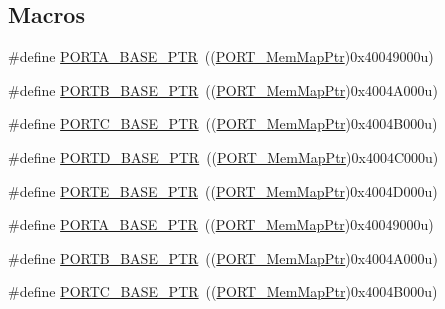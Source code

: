 \subsection*{Macros}
\begin{DoxyCompactItemize}
\item 
\#define \hyperlink{group___p_o_r_t___peripheral_gaa18ec7594fe603225220ec6eda4a19ce}{P\+O\+R\+T\+A\+\_\+\+B\+A\+S\+E\+\_\+\+P\+TR}~((\hyperlink{group___p_o_r_t___peripheral_ga0e26bafb7c17808f90278627bcbcaf8c}{P\+O\+R\+T\+\_\+\+Mem\+Map\+Ptr})0x40049000u)
\item 
\#define \hyperlink{group___p_o_r_t___peripheral_ga585b4782d1ceb44492289af0019480f9}{P\+O\+R\+T\+B\+\_\+\+B\+A\+S\+E\+\_\+\+P\+TR}~((\hyperlink{group___p_o_r_t___peripheral_ga0e26bafb7c17808f90278627bcbcaf8c}{P\+O\+R\+T\+\_\+\+Mem\+Map\+Ptr})0x4004\+A000u)
\item 
\#define \hyperlink{group___p_o_r_t___peripheral_ga03c740cdda17711afafc932723871474}{P\+O\+R\+T\+C\+\_\+\+B\+A\+S\+E\+\_\+\+P\+TR}~((\hyperlink{group___p_o_r_t___peripheral_ga0e26bafb7c17808f90278627bcbcaf8c}{P\+O\+R\+T\+\_\+\+Mem\+Map\+Ptr})0x4004\+B000u)
\item 
\#define \hyperlink{group___p_o_r_t___peripheral_ga7f5a263751543810ebfdbde278383276}{P\+O\+R\+T\+D\+\_\+\+B\+A\+S\+E\+\_\+\+P\+TR}~((\hyperlink{group___p_o_r_t___peripheral_ga0e26bafb7c17808f90278627bcbcaf8c}{P\+O\+R\+T\+\_\+\+Mem\+Map\+Ptr})0x4004\+C000u)
\item 
\#define \hyperlink{group___p_o_r_t___peripheral_gab166fe285bbb15b52de610f408fe25d3}{P\+O\+R\+T\+E\+\_\+\+B\+A\+S\+E\+\_\+\+P\+TR}~((\hyperlink{group___p_o_r_t___peripheral_ga0e26bafb7c17808f90278627bcbcaf8c}{P\+O\+R\+T\+\_\+\+Mem\+Map\+Ptr})0x4004\+D000u)
\item 
\#define \hyperlink{group___p_o_r_t___peripheral_gaa18ec7594fe603225220ec6eda4a19ce}{P\+O\+R\+T\+A\+\_\+\+B\+A\+S\+E\+\_\+\+P\+TR}~((\hyperlink{group___p_o_r_t___peripheral_ga0e26bafb7c17808f90278627bcbcaf8c}{P\+O\+R\+T\+\_\+\+Mem\+Map\+Ptr})0x40049000u)
\item 
\#define \hyperlink{group___p_o_r_t___peripheral_ga585b4782d1ceb44492289af0019480f9}{P\+O\+R\+T\+B\+\_\+\+B\+A\+S\+E\+\_\+\+P\+TR}~((\hyperlink{group___p_o_r_t___peripheral_ga0e26bafb7c17808f90278627bcbcaf8c}{P\+O\+R\+T\+\_\+\+Mem\+Map\+Ptr})0x4004\+A000u)
\item 
\#define \hyperlink{group___p_o_r_t___peripheral_ga03c740cdda17711afafc932723871474}{P\+O\+R\+T\+C\+\_\+\+B\+A\+S\+E\+\_\+\+P\+TR}~((\hyperlink{group___p_o_r_t___peripheral_ga0e26bafb7c17808f90278627bcbcaf8c}{P\+O\+R\+T\+\_\+\+Mem\+Map\+Ptr})0x4004\+B000u)

\end{DoxyCompactItemize}
